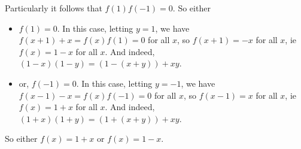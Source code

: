 \documentclass[a4paper,12pt,fleqn]{article}
\begin{document}
\begin{enumerate}
\begin{itemize}
    Particularly it follows that \(f(1) f(-1) = 0\). So either
    \begin{itemize}
     \item
      \(f(1) = 0\). In this case, letting \(y = 1\), we have
      \(f(x + 1) + x = f(x) f(1) = 0\) for all \(x\), so
      \(f(x + 1) = -x\) for all \(x\), ie \(f(x) = 1 - x\) for all \(x\). And
      indeed, \((1 - x)(1 - y) = (1 - (x + y)) + xy\).
     \item
      or, \(f(-1) = 0\). In this case, letting \(y = -1\), we have
      \(f(x - 1) - x = f(x) f(-1) = 0\) for all \(x\), so
      \(f(x - 1) = x\) for all \(x\), ie \(f(x) = 1 + x\) for all \(x\). And
      indeed, \((1 + x)(1 + y) = (1 + (x + y)) + xy\).
    \end{itemize}
  \end{itemize}
  So either \(f(x) = 1 + x\) or \(f(x) = 1 - x\).
\end{enumerate}
\end{document}
